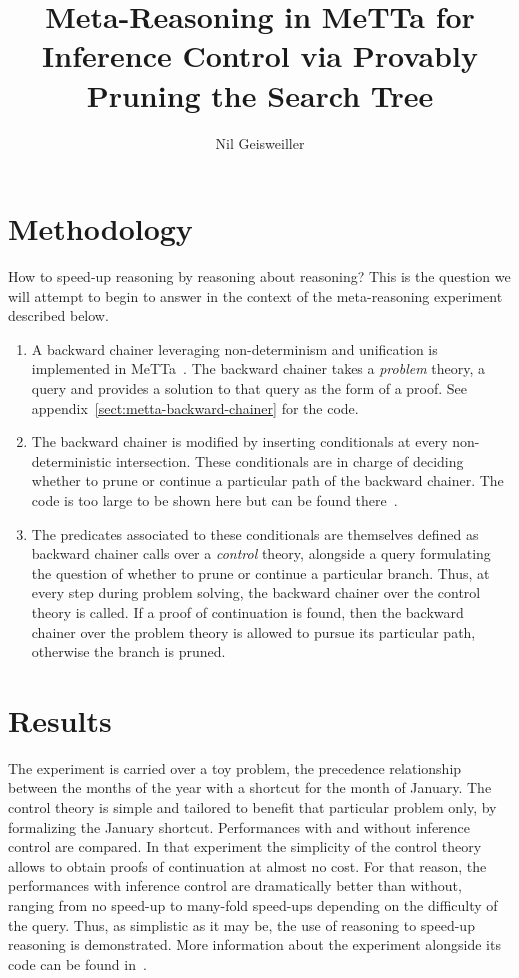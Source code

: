 \documentclass{easychair}
\title{Meta-Reasoning in MeTTa for Inference Control via Provably
  Pruning the Search Tree}
\author{Nil Geisweiller}
\institute{
  SingularityNET Foundation,\\
  Zug, Switzerland\\
  \email{nil@singularitynet.io}
}
\begin{document}
\maketitle

\section{Methodology}
\label{sect:introduction}

How to speed-up reasoning by reasoning about reasoning?  This is the
question we will attempt to begin to answer in the context of the
meta-reasoning experiment described below.
\begin{enumerate}
\item A backward chainer leveraging non-determinism and unification is
  implemented in MeTTa~\cite{TODO}.  The backward chainer takes a
  \emph{problem} theory, a query and provides a solution to that query
  as the form of a proof.  See
  appendix~\ref{sect:metta-backward-chainer} for the code.
\item The backward chainer is modified by inserting conditionals at
  every non-deterministic intersection.  These conditionals are in
  charge of deciding whether to prune or continue a particular path of
  the backward chainer.  The code is too large to be shown here but
  can be found there~\cite{TODO}.
\item The predicates associated to these conditionals are themselves
  defined as backward chainer calls over a \emph{control} theory,
  alongside a query formulating the question of whether to prune or
  continue a particular branch.  Thus, at every step during problem
  solving, the backward chainer over the control theory is called.  If
  a proof of continuation is found, then the backward chainer over the
  problem theory is allowed to pursue its particular path, otherwise
  the branch is pruned.
\end{enumerate}

\section{Results}

The experiment is carried over a toy problem, the precedence
relationship between the months of the year with a shortcut for the
month of January.  The control theory is simple and tailored to
benefit that particular problem only, by formalizing the January
shortcut.  Performances with and without inference control are
compared.  In that experiment the simplicity of the control theory
allows to obtain proofs of continuation at almost no cost.  For that
reason, the performances with inference control are dramatically
better than without, ranging from no speed-up to many-fold speed-ups
depending on the difficulty of the query.  Thus, as simplistic as it
may be, the use of reasoning to speed-up reasoning is demonstrated.
More information about the experiment alongside its code can be found
in~\cite{TODO}.
\end{document}
